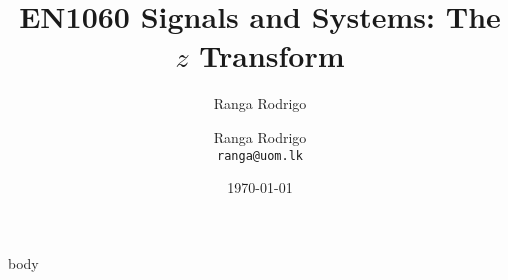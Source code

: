 \documentclass[t, aspectratio=169,xcolor={svgnames}, 10pt, handout]{beamer}
\title{EN1060 Signals and Systems: The $z$ Transform}
\author{Ranga Rodrigo}
\author[]{Ranga Rodrigo\\ \texttt{ranga@uom.lk}}
\institute[]{The University of Moratuwa, Sri Lanka}
\date{\today}
\begin{document}
    \begin{frame}
        \titlepage
    \end{frame}
















    {body}


\end{document}

